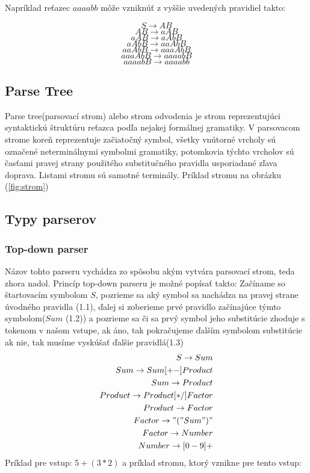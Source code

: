 \documentclass[12pt,a4paper]{report}
\theoremstyle{definition}
\theoremstyle{remark}
\begin{document}
Napríklad reťazec $aaaabb$ môže vzniknúť z vyššie uvedených pravidiel takto:

$$ S \to AB $$
$$ AB \to aAB $$
$$ aAB \to aAbB $$
$$ aAbB \to aaAbB $$
$$ aaAbB \to aaaAbB $$
$$ aaaAbB \to aaaabB $$
$$ aaaabB \to aaaabb $$
\subsection{Parse Tree}
Parse tree(parsovací strom) alebo strom odvodenia je strom reprezentujúci syntaktickú štruktúru reťazca podľa nejakej formálnej gramatiky. V parsovacom strome koreň reprezentuje začiatočný symbol, všetky vnútorné vrcholy sú označené neterminálnymi symbolmi gramatiky, potomkovia týchto vrcholov sú časťami pravej strany použitého substitučného pravidla usporiadané zľava doprava. Listami stromu sú samotné terminály. Príklad stromu na obrázku (\ref{fig:strom})
\subsection{Typy parserov}
\subsubsection*{Top-down parser} 
Názov tohto parseru vychádza zo spôsobu akým vytvára parsovací strom, teda zhora nadol.
Princíp top-down parseru je možné popísať takto: Začíname so štartovacím symbolom $S$, pozrieme sa aký symbol sa nachádza na pravej strane úvodného pravidla (1.1), ďalej si zoberieme prvé pravidlo začínajúce týmto symbolom($Sum$ (1.2)) a pozrieme sa či sa prvý symbol jeho substitúcie zhoduje s tokenom v našom vstupe, ak áno, tak pokračujeme ďalším symbolom substitúcie ak nie, tak musíme vyskúšať ďalšie pravidlá(1.3)
\begin{align}
S \to Sum \\
Sum \to Sum [+-] Product \\
Sum \to Product \\
Product \to Product [*/] Factor \\
Product \to Factor \\
Factor \to "(" Sum ")" \\
Factor \to Number \\
Number \to [0-9]+
\end{align}
\noindent 
Príklad pre vstup: $ 5 + (3 * 2)$ a príklad stromu, ktorý vznikne pre tento vstup: 
\end{document}
